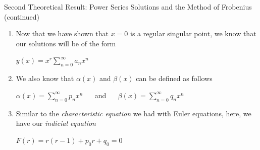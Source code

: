 \documentclass{beamer}
\begin{document}
\begin{frame}{Second Theoretical Result: Power Series Solutions and the Method of Frobenius (continued)}

\begin{enumerate}

\suite

\item Now that we have shown that $x=0$ is a regular singular point, we know that our solutions will be of the form

\begin{center}

\begin{minipage}{4cm}

\begin{varblock}[4cm]

$y(x)=x^r \sum_{n=0}^{\infty} a_{n} x^n$


\end{varblock}

\end{minipage}

\end{center}

\item We also know that $\alpha(x)$ and $\beta(x)$ can be defined as follows

 \begin{center}

\begin{minipage}{8cm}

\begin{varblock}[8cm]

$\alpha(x)=\sum_{n=0}^{\infty} p_{n} x^{n}$ $\quad$ and $\quad$ $\beta(x)=\sum_{n=0}^{\infty} q_{n} x^{n}$

\end{varblock}

\end{minipage}

\end{center}

\item Similar to the \textit{characteristic equation} we had with Euler equations, here, we have our \textit{indicial equation}

\begin{center}

\begin{minipage}{5cm}

\begin{varblock}[5cm]

$F(r)=r(r-1)+p_{0}r+q_{0}=0$

\end{varblock}

\end{minipage}

\end{center}

\asuivre

\end{enumerate}

\end{frame}
\end{document}

